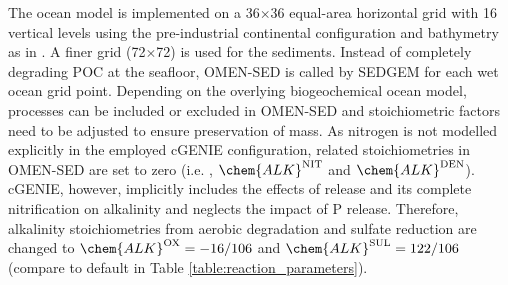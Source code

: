 \documentclass[gmd, manuscript]{copernicus}
\begin{document}
The ocean model is implemented on a 36$\times$36 equal-area horizontal grid with 16 vertical levels using the pre-industrial continental configuration and bathymetry as in \citet{archer_atmospheric_2009}. 
A finer grid (72$\times$72) is used for the sediments. 
Instead of completely degrading POC at the seafloor, OMEN-SED is called by SEDGEM for each wet ocean grid point. 
Depending on the overlying biogeochemical ocean model, processes can be included or excluded in OMEN-SED and stoichiometric factors need to be adjusted to ensure preservation of mass. 
As nitrogen is not modelled explicitly in the employed cGENIE configuration, related stoichiometries in OMEN-SED are set to zero (i.e. , $\chem{ALK}^\mathrm{NIT}$ and $\chem{ALK}^\mathrm{DEN}$). 
cGENIE, however, implicitly includes the effects of  release and its complete nitrification on alkalinity and neglects the impact of P release. Therefore, alkalinity 
stoichiometries from aerobic degradation and sulfate reduction are changed to $\chem{ALK}^\mathrm{OX} = -16/106$ and $\chem{ALK}^\mathrm{SUL} = 122/106$ (compare to default in Table \ref{table:reaction_parameters}).
\end{document}
